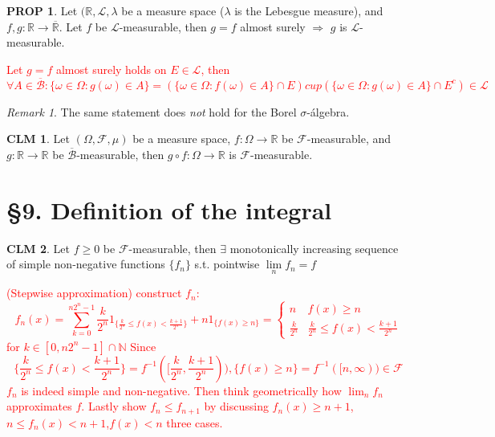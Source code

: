\documentclass[hidelinks]{article}
\theoremstyle{definition}
\theoremstyle{dotless}
\newtheorem{proposition}{PROP}[section]
\newtheorem{claim}{CLM}[section]
\theoremstyle{remark}
\newtheorem*{remark}{Remark}
\begin{document}
\begin{proposition}
Let $(\mathbb{R},\mathscr{L},\lambda$ be a measure space ($\lambda$ is the Lebesgue measure), and $f,g:\mathbb{R}\to\overline{\mathbb{R}}$. Let $f$ be $\mathscr{L}$-measurable, then $g=f$ almost surely $\Rightarrow$ $g$ is $\mathscr{L}$-measurable.
\end{proposition}
\textcolor{red}{Let $g=f$ almost surely holds on $E\in\mathscr{L}$, then
\[\forall A\in\overline{\mathscr{B}}:\{\omega\in\Omega:g(\omega)\in A\}=(\{\omega\in\Omega:f(\omega)\in A\}\cap E)cup(\{\omega\in\Omega:g(\omega)\in A\}\cap E^c)\in\mathscr{L}\]}

\begin{remark}
The same statement does \emph{not} hold for the Borel $\sigma$-álgebra.
\end{remark}

\begin{claim}
Let $(\Omega,\mathscr{F},\mu)$ be a measure space, $f:\Omega\to\mathbb{R}$ be $\mathscr{F}$-measurable, and $g:\mathbb{R}\to\mathbb{R}$ be $\overline{\mathscr{B}}$-measurable, then $g\circ f:\Omega\to\mathbb{R}$ is $\mathscr{F}$-measurable.
\end{claim}

\bigbreak

\section*{\S9. Definition of the integral}
\setcounter{section}{9}

\begin{claim}\label{CLM 9.21}
Let $f\geq0$ be $\mathscr{F}$-measurable, then $\exists$ monotonically increasing sequence of simple non-negative functions $\{f_n\}$ s.t. pointwise $\lim\limits_nf_n=f$
\end{claim}
\textcolor{red}{(Stepwise approximation) construct $f_n$:
\[f_n(x)=\sum_{k=0}^{n2^n-1}\frac{k}{2^n}1_{\{\frac{k}{2^n}\leq f(x)<\frac{k+1}{2^n}\}}+n1_{\{f(x)\geq n\}}=\begin{cases}
n & f(x)\geq n\\
\frac{k}{2^n} & \frac{k}{2^n}\leq f(x)<\frac{k+1}{2^n}
\end{cases}\]
for $k\in[0,n2^n-1]\cap\mathbb{N}$\newline
Since
\[\{\frac{k}{2^n}\leq f(x)<\frac{k+1}{2^n}\}=f^{-1}([\frac{k}{2^n},\frac{k+1}{2^n})),\{f(x)\geq n\}=f^{-1}([n,\infty))\in\mathscr{F}\]
$f_n$ is indeed simple and non-negative. Then think geometrically how $\lim_nf_n$ approximates $f$. Lastly show $f_n\leq f_{n+1}$ by discussing $f_n(x)\geq n+1$,$n\leq f_n(x)<n+1$,$f(x)<n$ three cases.}
\end{document}
